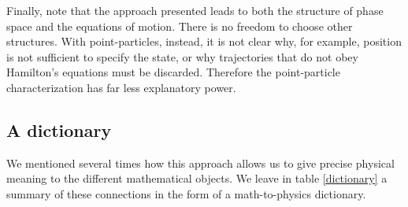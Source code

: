 \documentclass[11pt]{elsarticle}
\begin{document}
Finally, note that the approach presented leads to both the structure of phase space and the equations of motion. There is no freedom to choose other structures. With point-particles, instead, it is not clear why, for example, position is not sufficient to specify the state, or why trajectories that do not obey Hamilton's equations must be discarded. Therefore the point-particle characterization has far less explanatory power.

\subsection*{A dictionary}

We mentioned several times how this approach allows us to give precise physical meaning to the different mathematical objects. We leave in table \ref{dictionary} a summary of these connections in the form of a math-to-physics dictionary.
\end{document}
